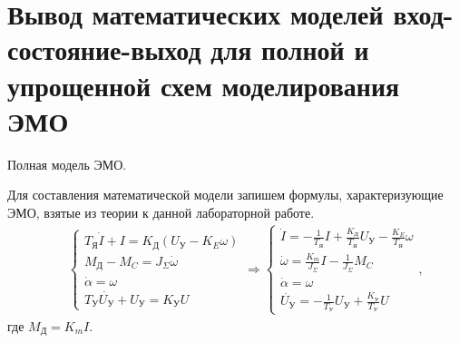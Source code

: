 \documentclass[12pt,a4paper]{article}
\begin{document}
\newpage
\section{Вывод математических моделей вход-состояние-выход для полной и упрощенной схем моделирования ЭМО}
Полная модель ЭМО.\par
Для составления математической модели запишем формулы, характеризующие ЭМО, взятые из теории к данной лабораторной работе.
\begin{align}
	&&\begin{cases}
		T_\text{Я}\dot{I} + I = K_\text{Д}(U_\text{У} - K_E\omega)\\
		M_\text{Д} - M_C = J_\Sigma\dot{\omega}\\
		\dot{\alpha} = \omega\\
		T_\text{У}\dot{U_\text{У}} + U_\text{У} = K_\text{У}U
	\end{cases}
	\Rightarrow
	\begin{cases}
		\dot{I} = \displaystyle{- \frac{1}{T_\text{Я}}I + \frac{K_\text{Д}}{T_\text{Я}}U_\text{У} -\frac{K_E}{T_\text{Я}}}\omega \\
		\dot{\omega} = \displaystyle{\frac{K_m}{J_\Sigma}}I - \frac{1}{J_\Sigma}M_C\\
		\dot{\alpha} = \omega\\
		\dot{U_\text{У}} = -\displaystyle{\frac{1}{T_\text{У}}U_\text{У}} + \frac{K_\text{У}}{T_\text{У}}U
	\end{cases}
	,
	\label{ESETh}
\end{align}
где $M_\text{Д} = K_mI$.
	
\end{document}
